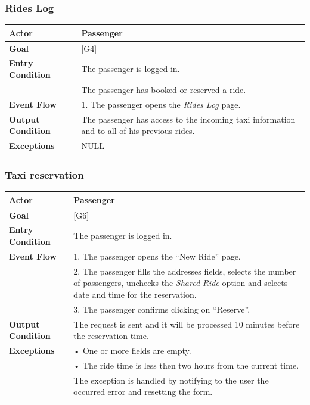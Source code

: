 \documentclass{article}
\begin{document}
\subsubsection{Rides Log}
\begin{tabular}{| l | p{8cm} |}
\hline
\textbf{Actor}      &       Passenger \\
\hline
\textbf{Goal}       &       [G4]\\
\hline
\textbf{Entry Condition} &  The passenger is logged in.\\&
                            The passenger has booked or reserved a ride.\\
\hline
\textbf{Event Flow}     &  1.	The passenger opens the \textit{Rides Log} page.\\
\hline
\textbf{Output Condition} & The passenger has access to the incoming taxi information and to all of his previous rides.\\
\hline
\textbf{Exceptions} &       NULL\\
\hline
\end{tabular} 

\subsubsection{Taxi reservation}
\begin{tabular}{| l | p{8cm} |}
\hline
\textbf{Actor}      &       Passenger \\
\hline
\textbf{Goal}       &       [G6]\\
\hline
\textbf{Entry Condition} &  The passenger is logged in.\\
\hline
\textbf{Event Flow}     & 1.	The passenger opens the “New Ride” page.\\&
                                            2.	The passenger fills the addresses fields, selects the number of passengers, unchecks the \textit{Shared Ride} option and selects date and time for the reservation.\\&
                                            3.	The passenger confirms clicking on “Reserve”.\\
\hline
\textbf{Output Condition} & The request is sent and it will be processed 10 minutes before the reservation time.\\
\hline
\textbf{Exceptions} &      •	One or more fields are empty.\\&
      •	The ride time is less then two hours from the current time.\\&
The exception is handled by notifying to the user the occurred error and resetting the form.\\
\hline
\end{tabular}
\end{document}

